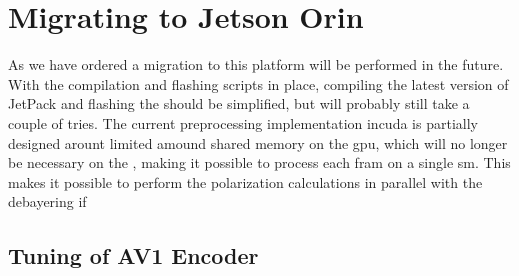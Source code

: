 \section{Migrating to Jetson Orin}
As we have ordered a \jo migration to this platform will be performed in the future.
With the compilation and flashing scripts in place, compiling the latest version of JetPack and flashing the \jo should be simplified, but will probably still take a couple of tries.
The current preprocessing implementation in\gls{cuda} is partially designed arount limited amound shared memory on the \jx \gls{gpu}, which will no longer be necessary on the \jo, making it possible to process each fram on a single \gls{sm}.
This makes it possible to perform the polarization calculations in parallel with the debayering if

\subsection{Tuning of AV1 Encoder}
\todo

